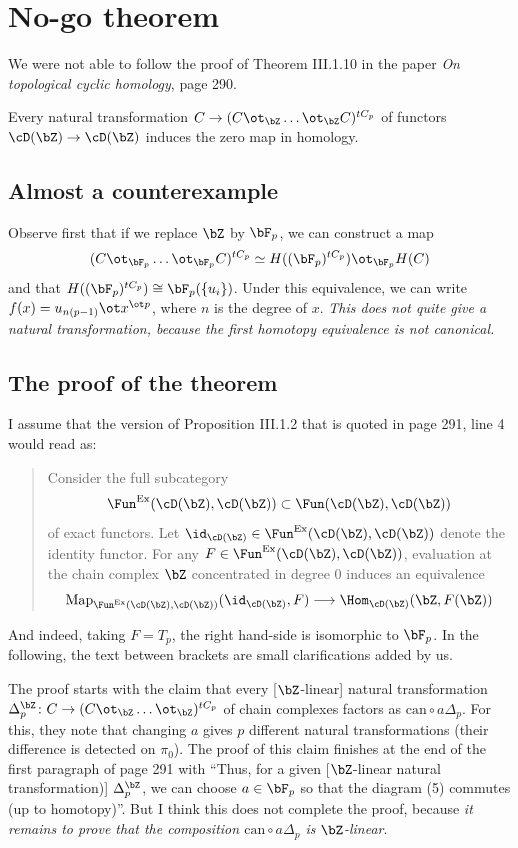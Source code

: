 
\section{No-go theorem}

We were not able to follow the proof of Theorem III.1.10 in the paper \emph{On topological cyclic homology}, page 290.

\begin{theorem*}
	Every natural transformation $C\to (C\ot_{\bZ}\dots \ot_{\bZ} C)^{tC_p}$ of functors $\cD(\bZ)\to \cD(\bZ)$ induces the zero map in homology.
\end{theorem*}
\subsection*{Almost a counterexample} Observe first that if we replace $\bZ$ by $\bF_p$, we can construct a map
\[
	(C\ot_{\bF_p}\dots \ot_{\bF_p} C)^{tC_p}\simeq H((\bF_p)^{tC_p})\ot_{\bF_p} H(C)
\]
and that $H((\bF_p)^{tC_p}) \cong \bF_p(\{u_i\})$. Under this equivalence, we can write $f(x) = u_{n(p-1)}\ot x^{\ot p}$, where $n$ is the degree of $x$. \emph{This does not quite give a natural transformation, because the first homotopy equivalence is not canonical.}

\subsection*{The proof of the theorem}

I assume that the version of Proposition III.1.2 that is quoted in page 291, line 4 would read as:
\begin{quote}
	Consider the full subcategory
	\[\Fun^{\mathrm{Ex}}(\cD(\bZ),\cD(\bZ))\subset \Fun(\cD(\bZ),\cD(\bZ))
	\]
	of exact functors. Let $\id_{\cD(\bZ)}\in \Fun^{\mathrm{Ex}}(\cD(\bZ),\cD(\bZ))$ denote the identity functor.
	For any $F\in \Fun^{\mathrm{Ex}}(\cD(\bZ),\cD(\bZ))$, evaluation at the chain complex $\bZ$ concentrated in degree $0$ induces an equivalence
	\[
		\mathrm{Map}_{\Fun^{\mathrm{Ex}}(\cD(\bZ),\cD(\bZ))}(\id_{\cD(\bZ)}, F)\longrightarrow
		\Hom_{\cD(\bZ)}(\bZ,F(\bZ))
	\]
\end{quote}
And indeed, taking $F=T_p$, the right hand-side is isomorphic to $\bF_p$. In the following, the text between brackets are small clarifications added by us.

The proof starts with the claim that every [$\bZ$-linear] natural transformation $\Delta_p^{\bZ}\colon C\to (C\ot_{\bZ}\dots \ot_{\bZ})^{tC_p}$ of chain complexes factors as $\mathrm{can}\circ a\Delta_p$. For this, they note that changing $a$ gives $p$ different natural transformations (their difference is detected on $\pi_0$). The proof of this claim finishes at the end of the first paragraph of page 291 with ``Thus, for a given [$\bZ$-linear natural transformation)] $\Delta_p^{\bZ}$, we can choose $a\in \bF_p$ so that the diagram (5) commutes (up to homotopy)''. But I think this does not complete the proof, because \emph{it remains to prove that the composition $\mathrm{can}\circ a\Delta_p$ is $\bZ$-linear}.

